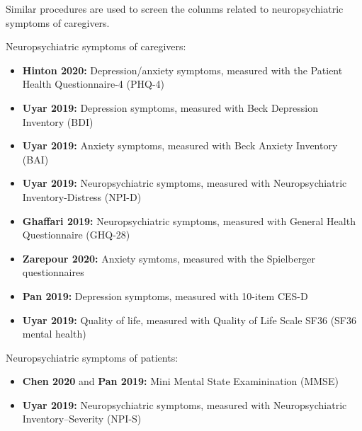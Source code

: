 \documentclass[
]{article}
\providecommand{\tightlist}{%
  \setlength{\itemsep}{0pt}\setlength{\parskip}{0pt}}
\begin{document}
Similar procedures are used to screen the colunms related to
neuropsychiatric symptoms of caregivers.

Neuropsychiatric symptoms of caregivers:

\begin{itemize}
\tightlist
\item
  \textbf{Hinton 2020:} Depression/anxiety symptoms, measured with the
  Patient Health Questionnaire-4 (PHQ-4)
\item
  \textbf{Uyar 2019:} Depression symptoms, measured with Beck Depression
  Inventory (BDI)
\item
  \textbf{Uyar 2019:} Anxiety symptoms, measured with Beck Anxiety
  Inventory (BAI)
\item
  \textbf{Uyar 2019:} Neuropsychiatric symptoms, measured with
  Neuropsychiatric Inventory-Distress (NPI-D)
\item
  \textbf{Ghaffari 2019:} Neuropsychiatric symptoms, measured with
  General Health Questionnaire (GHQ-28)
\item
  \textbf{Zarepour 2020:} Anxiety symtoms, measured with the Spielberger
  questionnaires
\item
  \textbf{Pan 2019:} Depression symptoms, measured with 10-item CES-D
\item
  \textbf{Uyar 2019:} Quality of life, measured with Quality of Life
  Scale SF36 (SF36 mental health)
\end{itemize}

Neuropsychiatric symptoms of patients:

\begin{itemize}
\tightlist
\item
  \textbf{Chen 2020} and \textbf{Pan 2019:} Mini Mental State
  Examinination (MMSE)
\item
  \textbf{Uyar 2019:} Neuropsychiatric symptoms, measured with
  Neuropsychiatric Inventory--Severity (NPI-S)
\end{itemize}
\end{document}
